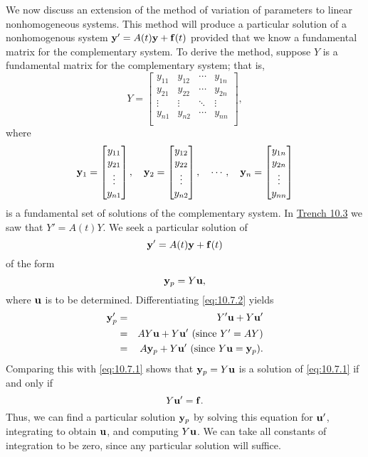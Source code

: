 \documentclass{ximera}
\begin{document}
We now discuss an extension of the method of variation of parameters
to linear nonhomogeneous systems. This method will produce a
particular solution of a nonhomogenous system ${\bf y}'=A(t){\bf y}+{\bf f}(t)$ provided that we know a fundamental matrix for the
complementary system. To derive the method, suppose $Y$ is a
fundamental matrix for the complementary system; that is,
$$
Y=\begin{bmatrix}
y_{11}&y_{12}&\cdots&y_{1n} \\
y_{21}&y_{22}&\cdots&y_{2n}\\
\vdots&\vdots&\ddots&\vdots \\
y_{n1}&y_{n2}&\cdots&y_{nn} \\
\end{bmatrix},
$$
where
$$
{\bf y}_1=\begin{bmatrix}y_{11}\\y_{21}\\ \vdots\\
y_{n1}\end{bmatrix},\quad
{\bf y}_2=\begin{bmatrix}y_{12}\\y_{22}\\ \vdots\\
y_{n2}\end{bmatrix},\quad \cdots,\quad
{\bf y}_n=\begin{bmatrix}y_{1n}\\y_{2n}\\ \vdots\\
y_{nn}\end{bmatrix}
$$
is a fundamental set of solutions of the complementary system.
In \href{https://ximera.osu.edu/ode/main/homogeneousLinearSys/homogeneousLinearSys}{Trench 10.3} we saw that $Y'=A(t)Y$. We seek a
particular solution of
\begin{equation} \label{eq:10.7.1}
{\bf y}'=A(t){\bf y}+{\bf f}(t)
\end{equation}
 of the form
\begin{equation} \label{eq:10.7.2}
{\bf y}_p=Y{\bf u},
\end{equation}
 where ${\bf u}$ is to be determined. Differentiating \eqref{eq:10.7.2} yields
\begin{eqnarray*}
 {\bf y}_p'&=&Y' {\bf u}+Y {\bf u}'
\\&=&A Y {\bf u}+Y {\bf u}'\mbox{ (since $Y'=AY$)}\\&=&
 A{\bf y}_p+Y {\bf u}'\mbox{ (since $Y{\bf u}={\bf y}_p$)}.
\end{eqnarray*}
Comparing this with  \eqref{eq:10.7.1} shows that ${\bf y}_p=Y{\bf u}$ is a
solution of \eqref{eq:10.7.1} if and only if
$$
Y{\bf u}'={\bf f}.
$$
Thus, we can find a particular solution ${\bf y}_p$ by solving this
equation for ${\bf u}'$, integrating to obtain ${\bf u}$, and
computing $Y{\bf u}$. We can take all constants of integration to be
zero, since any particular solution will suffice.
\end{document}
